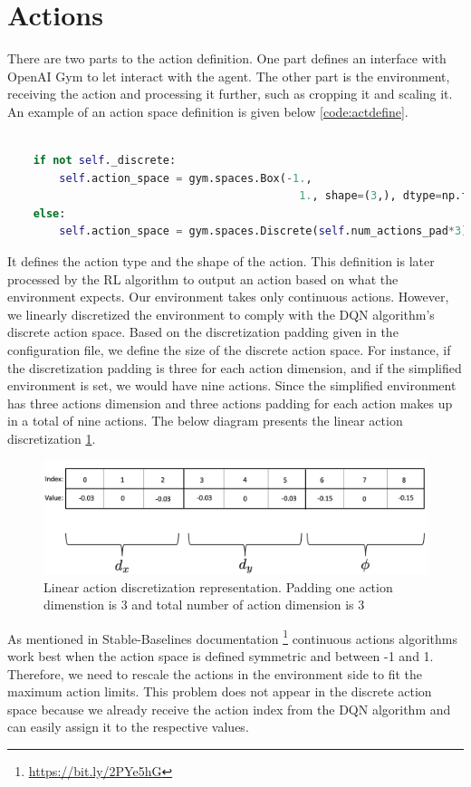\section{Actions}

There are two parts to the action definition. One part defines an interface with OpenAI Gym to let interact with the agent. The other part is the environment, receiving the action and processing it further, such as cropping it and scaling it. An example of an action space definition is given below \ref{code:actdefine}. 

\begin{lstlisting}[language=Python, caption=OpenAI gym action space definition, label=code:actdefine]

    if not self._discrete:
        self.action_space = gym.spaces.Box(-1.,
                                             1., shape=(3,), dtype=np.float32)
    else:
        self.action_space = gym.spaces.Discrete(self.num_actions_pad*3)

\end{lstlisting}


It defines the action type and the shape of the action. This definition is later processed by the RL algorithm to output an action based on what the environment expects. Our environment takes only continuous actions. However, we linearly discretized the environment to comply with the DQN algorithm's discrete action space. Based on the discretization padding given in the configuration file, we define the size of the discrete action space. For instance, if the discretization padding is three for each action dimension, and if the simplified environment is set, we would have nine actions. Since the simplified environment has three actions dimension and three actions padding for each action makes up in a total of nine actions. The below diagram presents the linear action discretization \ref{fig:disc}.

\begin{figure}[htbp]
    \centering
    \includegraphics[width=1\textwidth]{figures/discretization.png}
    \caption{Linear action discretization representation. Padding one action dimenstion is 3 and total number of action dimension is 3}
    \label{fig:disc}
\end{figure}

As mentioned in Stable-Baselines documentation \footnote{\url{https://bit.ly/2PYe5hG}} continuous actions algorithms work best when the action space is defined symmetric and between -1 and 1. Therefore, we need to rescale the actions in the environment side to fit the maximum action limits. This problem does not appear in the discrete action space because we already receive the action index from the DQN algorithm and can easily assign it to the respective values.